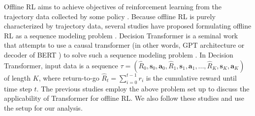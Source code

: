 Offline RL aims to achieve objectives of reinforcement learning from the trajectory data collected by some policy \cite{levine2020offline}. Because offline RL is purely characterized by trajectory data, several studies have proposed formulating offline RL as a sequence modeling problem \cite{janner2021offline,chen2021decision}. Decision Transformer is a seminal work that attempts to use a causal transformer (in other words, GPT architecture or decoder of BERT \cite{devlin2018bert}) to solve such a sequence modeling problem \cite{chen2021decision}. In Decision Transformer, input data is a 
sequence $\tau = (\hat{R}_0,  \bm{s}_0, \bm{a}_0, \hat{R}_1, \bm{s}_1, \bm{a}_1, ..., \hat{R}_K,  \bm{s}_K, \bm{a}_K)$ of length $K$, where return-to-go $\hat{R}_t = \sum_{i = 0}^{t - 1} r_i$ is the cumulative reward until time step $t$. The previous studies \cite{reid2022can,chen2021decision} employ the above problem set up to discuss the applicability of Transformer for offline RL. We also follow these studies and use the setup for our analysis.
